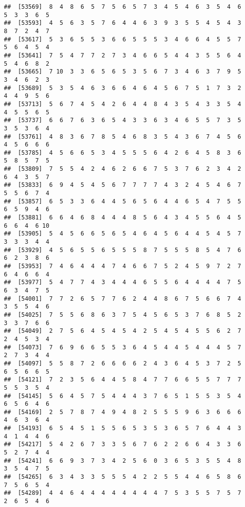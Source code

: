 \documentclass[
]{book}
\begin{document}
\begin{verbatim}
##  [53569]  8  4  8  6  5  7  5  6  5  7  3  4  5  4  6  3  5  4  6  5  3  3  6  5
##  [53593]  4  5  6  3  5  7  6  4  4  6  3  9  3  5  5  4  5  4  3  8  7  2  4  7
##  [53617]  5  3  6  5  5  3  6  6  5  5  5  3  4  6  6  4  5  5  7  5  6  4  5  4
##  [53641]  7  5  4  7  7  2  7  3  4  6  6  5  4  4  3  5  5  6  4  5  4  6  8  2
##  [53665]  7 10  3  3  6  5  6  5  3  5  6  7  3  4  6  3  7  9  5  3  4  6  2  3
##  [53689]  5  3  5  4  6  3  6  6  4  6  4  5  6  7  5  1  7  3  2  4  4  9  5  6
##  [53713]  5  6  7  4  5  4  2  6  4  4  8  4  3  5  4  3  3  5  4  4  5  5  6  5
##  [53737]  6  6  7  6  3  6  5  4  3  3  6  3  4  6  5  5  7  3  5  3  5  3  6  4
##  [53761]  4  8  3  6  7  8  5  4  6  8  3  5  4  3  6  7  4  5  6  4  5  6  6  6
##  [53785]  4  5  6  6  5  3  4  5  5  5  6  4  2  6  4  5  8  3  6  5  8  5  7  5
##  [53809]  7  5  5  4  2  4  6  2  6  6  7  5  3  7  6  2  3  4  2  6  4  3  5  7
##  [53833]  6  9  4  5  4  5  6  7  7  7  7  4  3  2  4  5  4  6  7  5  5  6  7  4
##  [53857]  6  5  3  3  6  4  4  5  6  5  6  4  4  6  5  4  7  5  5  6  5  9  4  6
##  [53881]  6  6  4  6  8  4  4  4  8  5  6  4  3  4  5  5  6  4  5  6  6  4  6 10
##  [53905]  5  4  5  6  6  5  6  5  4  6  4  5  6  4  4  5  4  5  7  3  3  3  4  4
##  [53929]  4  5  6  5  5  6  5  5  5  8  7  5  5  5  8  5  4  7  6  6  2  3  8  6
##  [53953]  7  4  6  4  4  4  7  4  6  6  7  5  2  4  5  9  7  2  7  6  4  6  6  4
##  [53977]  5  4  7  7  4  3  4  4  4  6  5  5  6  4  4  4  4  7  5  6  3  4  7  5
##  [54001]  7  7  2  6  5  7  7  6  2  4  4  8  6  7  5  6  6  7  4  3  5  5  4  6
##  [54025]  7  5  5  6  8  6  3  7  5  4  5  6  5  3  7  6  8  5  2  3  3  7  6  6
##  [54049]  2  7  5  6  4  5  4  5  4  2  5  4  5  4  5  5  6  2  7  2  4  5  3  4
##  [54073]  7  6  9  6  6  5  5  3  6  4  5  4  4  5  4  4  4  5  7  2  7  3  4  4
##  [54097]  5  5  8  7  2  6  6  6  6  2  4  3  6  4  5  3  7  2  5  6  5  6  6  5
##  [54121]  7  2  3  5  6  4  4  5  8  4  7  7  6  6  5  5  7  7  7  5  5  3  5  4
##  [54145]  5  6  4  5  7  5  4  4  4  3  7  6  5  1  5  5  3  5  4  6  5  6  4  6
##  [54169]  2  5  7  8  7  4  9  4  8  2  5  5  5  9  6  3  6  6  6  4  6  3  6  4
##  [54193]  6  5  4  5  1  5  5  6  5  3  5  3  6  5  7  6  4  4  3  4  1  4  4  6
##  [54217]  5  4  2  6  7  3  3  5  6  7  6  2  2  6  6  4  3  3  6  5  2  7  4  4
##  [54241]  6  6  9  3  7  3  4  2  5  6  0  3  6  5  3  5  5  4  8  3  5  4  7  5
##  [54265]  6  3  4  3  3  5  5  5  4  2  2  5  5  4  4  6  5  8  6  7  5  6  5  4
##  [54289]  4  4  6  4  4  4  4  4  4  4  4  7  5  3  5  5  7  5  7  2  6  5  4  6

\end{verbatim}
\end{document}
